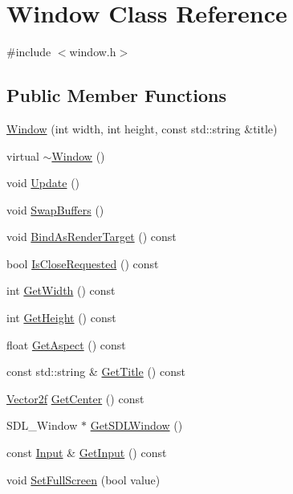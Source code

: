 \hypertarget{class_window}{}\section{Window Class Reference}
\label{class_window}


{\ttfamily \#include $<$window.\+h$>$}

\subsection*{Public Member Functions}
\begin{DoxyCompactItemize}
\item 
\hyperlink{class_window_a2bf7954f0cf38a7fc4c4742e4a91a190}{Window} (int width, int height, const std\+::string \&title)
\item 
virtual \hyperlink{class_window_a245d821e6016fa1f6970ccbbedd635f6}{$\sim$\+Window} ()
\item 
void \hyperlink{class_window_ab8d28dce3166c70eb5744466460795df}{Update} ()
\item 
void \hyperlink{class_window_abe1b83eda6980f2b9964aab08b5310ed}{Swap\+Buffers} ()
\item 
void \hyperlink{class_window_a7b9db9583287699589b2cd8414eb8ca3}{Bind\+As\+Render\+Target} () const 
\item 
bool \hyperlink{class_window_ad8d9c297161e3221fdfe8e1b22d82d16}{Is\+Close\+Requested} () const 
\item 
int \hyperlink{class_window_a002e19bc6ca085926d13cf7b97bb3cd3}{Get\+Width} () const 
\item 
int \hyperlink{class_window_a75f6cc315ae3ea6794e640e610d0fb44}{Get\+Height} () const 
\item 
float \hyperlink{class_window_a8cbbffba60d9268b485e713726290c84}{Get\+Aspect} () const 
\item 
const std\+::string \& \hyperlink{class_window_ab6279d2fd6158716efa5b75fed4670d2}{Get\+Title} () const 
\item 
\hyperlink{math3d_8h_a9f3739462b0605dcb64299fa289b6afe}{Vector2f} \hyperlink{class_window_a0f4737f348e84b915dfdbcbba19876c7}{Get\+Center} () const 
\item 
S\+D\+L\+\_\+\+Window $\ast$ \hyperlink{class_window_ae9b9dadb24a237aa3b6ce43e03d0f592}{Get\+S\+D\+L\+Window} ()
\item 
const \hyperlink{class_input}{Input} \& \hyperlink{class_window_a0e893bddb6d546a8f2966df21e44249c}{Get\+Input} () const 
\item 
void \hyperlink{class_window_a5aca5526280a2f95f42c732a407a6129}{Set\+Full\+Screen} (bool value)
\end{DoxyCompactItemize}


